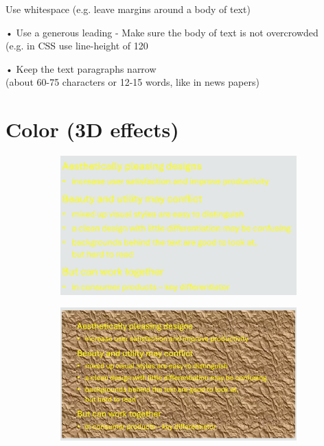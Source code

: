 \documentclass[]{project_plan}
\begin{document}
Use whitespace (e.g. leave margins around a body of text)

• Use a generous leading - Make sure the body of text is not overcrowded\\
(e.g. in CSS use line-height of 120%

• Keep the text paragraphs narrow\\
(about 60-75 characters or 12-15 words, like in news papers)

\newpage

\section{Color (3D effects)}

\begin{figure}
  \centering
  \begin{subfigure}{.5\textwidth}
    \centering
    \includegraphics[width=\linewidth]{graphic_design_color_bg_bad1.png}
  \end{subfigure}%
  \begin{subfigure}{.5\textwidth}
    \centering
    \includegraphics[width=\linewidth]{graphic_design_color_bg_bad2.png}
  \end{subfigure}
\end{figure}
\end{document}
